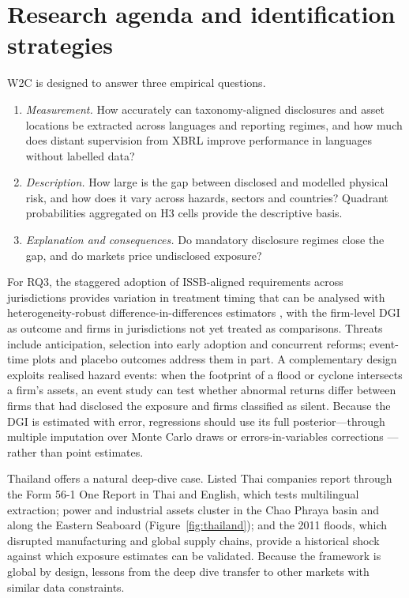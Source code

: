 \documentclass{article}
\theoremstyle{plain}
\theoremstyle{definition}
\begin{document}
\section{Research agenda and identification strategies}
\label{sec:agenda}

W2C is designed to answer three empirical questions.
\begin{enumerate}[label=\textbf{RQ\arabic*.}, leftmargin=3.2em]
  \item \emph{Measurement.} How accurately can taxonomy-aligned disclosures and asset locations be extracted across languages and reporting regimes, and how much does distant supervision from XBRL improve performance in languages without labelled data?
  \item \emph{Description.} How large is the gap between disclosed and modelled physical risk, and how does it vary across hazards, sectors and countries? Quadrant probabilities aggregated on H3 cells provide the descriptive basis.
  \item \emph{Explanation and consequences.} Do mandatory disclosure regimes close the gap, and do markets price undisclosed exposure?
\end{enumerate}

For RQ3, the staggered adoption of ISSB-aligned requirements across jurisdictions provides variation in treatment timing that can be analysed with heterogeneity-robust difference-in-differences estimators \citep{callaway2021did}, with the firm-level DGI as outcome and firms in jurisdictions not yet treated as comparisons. Threats include anticipation, selection into early adoption and concurrent reforms; event-time plots and placebo outcomes address them in part. A complementary design exploits realised hazard events: when the footprint of a flood or cyclone intersects a firm's assets, an event study \citep{mackinlay1997event} can test whether abnormal returns differ between firms that had disclosed the exposure and firms classified as silent. Because the DGI is estimated with error, regressions should use its full posterior---through multiple imputation over Monte Carlo draws or errors-in-variables corrections \citep{carroll2006measurement}---rather than point estimates.

Thailand offers a natural deep-dive case. Listed Thai companies report through the Form 56-1 One Report in Thai and English, which tests multilingual extraction; power and industrial assets cluster in the Chao Phraya basin and along the Eastern Seaboard (Figure~\ref{fig:thailand}); and the 2011 floods, which disrupted manufacturing and global supply chains, provide a historical shock against which exposure estimates can be validated. Because the framework is global by design, lessons from the deep dive transfer to other markets with similar data constraints.
\end{document}
